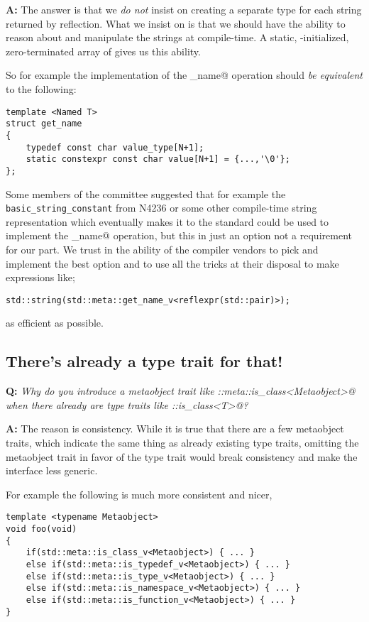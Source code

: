 \textbf{A:} The answer is that we {\em do not} insist on creating a separate
type for each string returned by reflection. What we insist on is that we
should have the ability to reason about and manipulate the strings at compile-time.
A static, \verb@constexpr@-initialized, zero-terminated array of \verb@char@s
gives us this ability.

So for example the implementation of the \verb@get_name@ operation should
{\em be equivalent} to the following:

\begin{verbatim}
template <Named T>
struct get_name
{
	typedef const char value_type[N+1];
	static constexpr const char value[N+1] = {...,'\0'};
};
\end{verbatim}

Some members of the committee suggested that for example the
\texttt{basic\_string\_constant} from N4236 or some other compile-time
string representation which eventually makes it to the standard could
be used to implement the \verb@get_name@ operation,
but this in just an option not a requirement for our part.
We trust in the ability of the compiler vendors to pick and
implement the best option and to use all the tricks at their disposal
to make expressions like;

\begin{verbatim}
std::string(std::meta::get_name_v<reflexpr(std::pair)>);
\end{verbatim}

as efficient as possible.

\subsection{There's already a type trait for that!}

\textbf{Q:} {\em Why do you introduce a metaobject trait like
\verb@std::meta::is_class<Metaobject>@  when there already are type traits like
\verb@std::is_class<T>@?}

\textbf{A:} The reason is consistency.
While it is true that there are a few metaobject traits, which indicate the
same thing as already existing type traits, omitting the metaobject trait
in favor of the type trait would break consistency and make the interface less generic.

For example the following is much more consistent and nicer,

\begin{verbatim}
template <typename Metaobject>
void foo(void)
{
	if(std::meta::is_class_v<Metaobject>) { ... }
	else if(std::meta::is_typedef_v<Metaobject>) { ... }
	else if(std::meta::is_type_v<Metaobject>) { ... }
	else if(std::meta::is_namespace_v<Metaobject>) { ... }
	else if(std::meta::is_function_v<Metaobject>) { ... }
}
\end{verbatim}

